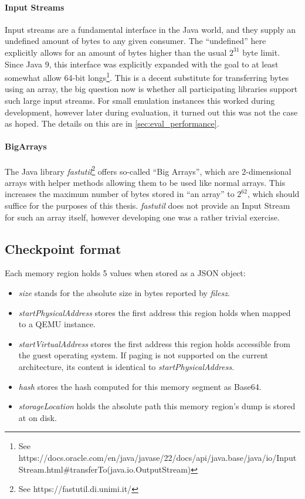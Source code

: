 \paragraph{Input Streams}
Input streams are a fundamental interface in the Java world,
and they supply an undefined amount of bytes to any given consumer.
The \enquote{undefined} here explicitly allows for an amount of bytes higher than the usual $2^{31}$ byte limit.
Since Java 9, this interface was explicitly expanded with the goal to at least somewhat allow 64-bit longs\footnote{See https://docs.oracle.com/en/java/javase/22/docs/api/java.base/java/io/InputStream.html#transferTo(java.io.OutputStream)}.
This is a decent substitute for transferring bytes using an array,
the big question now is whether all participating libraries support such large input streams.
For small emulation instances this worked during development,
however later during evaluation, it turned out this was not the case as hoped.
The details on this are in \autoref{sec:eval_performance}.

\paragraph{BigArrays}
The Java library \emph{fastutil}\footnote{See https://fastutil.di.unimi.it/} offers so-called \enquote{Big Arrays},
which are 2-dimensional arrays with helper methods allowing them to be used like normal arrays.
This increases the maximum number of bytes stored in \enquote{an array} to $2^{62}$,
which should suffice for the purposes of this thesis.
\emph{fastutil} does not provide an Input Stream for such an array itself,
however developing one was a rather trivial exercise.

\subsection{Checkpoint format}
Each memory region holds 5 values when stored as a JSON object:
\begin{itemize}
    \item \emph{size} stands for the absolute size in bytes reported by \emph{filesz}.
    \item \emph{startPhysicalAddress} stores the first address this region holds when mapped to a QEMU instance.
    \item \emph{startVirtualAddress} stores the first address this region holds accessible from the guest operating system.
    If paging is not supported on the current architecture, its content is identical to \emph{startPhysicalAddress}.
    \item \emph{hash} stores the hash computed for this memory segment as Base64.
    \item \emph{storageLocation} holds the absolute path this memory region's dump is stored at on disk.
\end{itemize}

